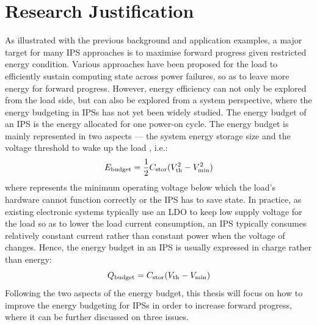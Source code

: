 \section{Research Justification}


As illustrated with the previous background and application examples, a major target for many IPS approaches is to maximise forward progress given restricted energy condition. 
Various approaches have been proposed \needref for the load to efficiently sustain computing state across power failures, so as to leave more energy for forward progress. 
However, energy efficiency can not only be explored from the load side, but can also be explored from a system perspective, where the energy budgeting in IPSs has not yet been widely studied. 
The energy budget of an IPS is the energy allocated for one power-on cycle.
The energy budget is mainly represented in two aspects --- the system energy storage size  and the voltage threshold to wake up the load , i.e.:
\begin{equation}
    E_{\text{budget}} = \frac{1}{2}C_{\text{stor}}(V_{\text{th}} ^ 2 - V_{\text{min}} ^ 2)
\end{equation}
where  represents the minimum operating voltage below which the load's hardware cannot function correctly or the IPS has to save state.
In practice, as existing electronic systems typically use an LDO to keep low supply voltage for the load so as to lower the load current consumption, an IPS typically consumes relatively constant current rather than constant power when the voltage of  changes. 
Hence, the energy budget in an IPS is usually expressed in charge rather than energy:
\begin{equation}
    Q_{\text{budget}} = C_{\text{stor}}(V_{\text{th}} - V_{\text{min}})
\end{equation}
Following the two aspects of the energy budget, this thesis will focus on how to improve the energy budgeting for IPSs in order to increase forward progress, where it can be further discussed on three issues. 

